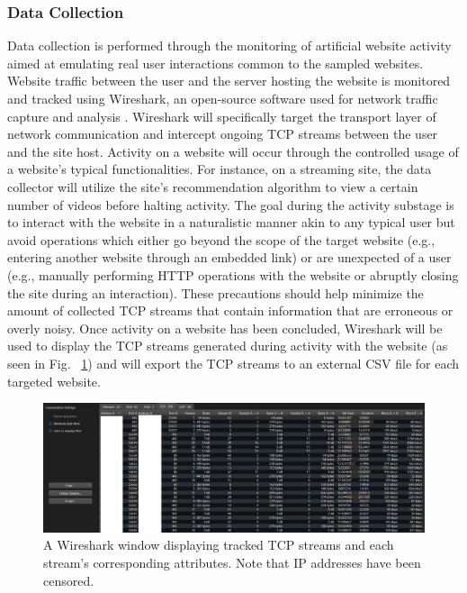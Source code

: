 \documentclass[10pt,sigconf,letterpaper,nonacm]{acmart}
\begin{document}
\subsubsection{Data Collection}
Data collection is performed through the monitoring of artificial website activity aimed at emulating real user interactions common to the sampled websites.
Website traffic between the user and the server hosting the website is monitored and tracked using Wireshark, an open-source software used for network traffic capture and analysis \cite{wireshark}.
Wireshark will specifically target the transport layer of network communication and intercept ongoing TCP streams between the user and the site host.
Activity on a website will occur through the controlled usage of a website's typical functionalities.
For instance, on a streaming site, the data collector will utilize the site's recommendation algorithm to view a certain number of videos before halting activity.
The goal during the activity substage is to interact with the website in a naturalistic manner akin to any typical user but avoid operations which either go beyond the scope of the target website (e.g., entering another website through an embedded link) or are unexpected of a user (e.g., manually performing HTTP operations with the website or abruptly closing the site during an interaction).
These precautions should help minimize the amount of collected TCP streams that contain information that are erroneous or overly noisy.
Once activity on a website has been concluded, Wireshark will be used to display the TCP streams generated during activity with the website (as seen in Fig. ~\ref{fig:wireshark}) and will export the TCP streams to an external CSV file for each targeted website.

\begin{figure}[h]
  \centering
  \includegraphics[width=.9\pdfpagewidth]{img/wireshark.png}
  \caption{A Wireshark window displaying tracked TCP streams and each stream's corresponding attributes. Note that IP addresses have been censored.}
  \label{fig:wireshark}
\end{figure}
\end{document}
